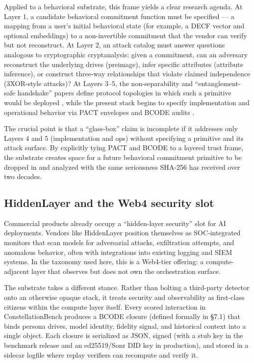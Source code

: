 Applied to a behavioral substrate, this frame yields a clear research
agenda. At Layer 1, a candidate behavioral commitment function must be
specified --- a mapping from a user's initial behavioral state (for
example, a DECF vector and optional embeddings) to a non-invertible
commitment that the vendor can verify but not reconstruct. At Layer 2,
an attack catalog must answer questions analogous to cryptographic
cryptanalysis: given a commitment, can an adversary reconstruct the
underlying drives (preimage), infer specific attributes (attribute
inference), or construct three-way relationships that violate claimed
independence (3XOR-style attacks)? At Layers 3--5, the non-separability
and ``entanglement-safe handshake'' papers define protocol topologies in
which such a primitive would be deployed
\citep{wp2_entanglement_safe_handshake}, while the present stack begins
to specify implementation and operational behavior via PACT envelopes
and BCODE audits \citep{pact_protocol_spec}.

The crucial point is that a ``glass-box'' claim is incomplete if it
addresses only Layers 4 and 5 (implementation and ops) without
specifying a primitive and its attack surface. By explicitly tying PACT
and BCODE to a layered trust frame, the substrate creates space for a
future behavioral commitment primitive to be dropped in and analyzed
with the same seriousness SHA-256 has received over two decades.

\subsection{HiddenLayer and the Web4 security
slot}\label{hiddenlayer-and-the-web4-security-slot}

Commercial products already occupy a ``hidden-layer security'' slot for
AI deployments. Vendors like HiddenLayer \citep{hiddenlayer} position
themselves as SOC-integrated monitors that scan models for adversarial
attacks, exfiltration attempts, and anomalous behavior, often with
integrations into existing logging and SIEM systems. In the taxonomy
used here, this is a Web4-tier offering: a compute-adjacent layer that
observes but does not own the orchestration surface.

The substrate takes a different stance. Rather than bolting a
third-party detector onto an otherwise opaque stack, it treats security
and observability as first-class citizens within the compute layer
itself. Every scored interaction in ConstellationBench produces a BCODE
closure (defined formally in §7.1) that binds persona drives, model
identity, fidelity signal, and historical context into a single object.
Each closure is serialized as JSON, signed (with a stub key in the
benchmark release and an ed25519/Sonr DID key in production), and stored
in a sidecar logfile where replay verifiers can recompute and verify it.

